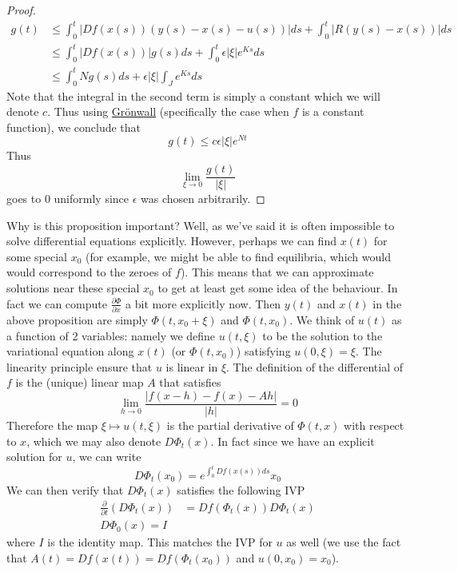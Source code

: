 \begin{proof}
    \begin{align*}
        g(t) &\leq \int_0^t |Df(x(s))(y(s) - x(s) - u(s))| ds + \int_0^t |R(y(s) - x(s))| ds\\
        &\leq \int_0^t |Df(x(s))| g(s) ds + \int_0^t \epsilon |\xi| e^{Ks} ds\\
        &\leq \int_0^t N g(s) ds + \epsilon |\xi| \int_{J} e^{Ks} ds
    \end{align*}
    Note that the integral in the second term is simply a constant which we will denote $c$. Thus using \hyperref[thm:big-gronwall]{Grönwall} (specifically the case when $f$ is a constant function), we conclude that
    $$ g(t) \leq c \epsilon |\xi| e^{Nt} $$
    Thus 
    $$ \lim_{\xi \to 0} \frac{g(t)}{|\xi|} $$
    goes to 0 uniformly since $\epsilon$ was chosen arbitrarily.    
\end{proof}
Why is this proposition important? Well, as we've said it is often impossible to solve differential equations explicitly. However, perhaps we can find $x(t)$ for some special $x_0$ (for example, we might be able to find equilibria, which would would correspond to the zeroes of $f$). This means that we can approximate solutions near these special $x_0$ to get at least get some idea of the behaviour. In fact we can compute $\frac{\partial \Phi}{\partial x}$ a bit more explicitly now. Then $y(t)$ and $x(t)$ in the above proposition are simply $\Phi(t, x_0 + \xi)$ and $\Phi(t, x_0)$. We think of $u(t)$ as a function of 2 variables: namely we define $u(t, \xi)$ to be the solution to the variational equation along $x(t)$ (or $\Phi(t, x_0)$) satisfying $u(0, \xi) = \xi$. The linearity principle ensure that $u$ is linear in $\xi$. The definition of the differential of $f$ is the (unique) linear map $A$ that satisfies 
$$ \lim_{h \to 0} \frac{|f(x - h) - f(x) - Ah|}{|h|} = 0 $$
Therefore the map $\xi \mapsto u(t, \xi)$ is the partial derivative of $\Phi(t, x)$ with respect to $x$, which we may also denote $D\Phi_t(x)$. In fact since we have an explicit solution for $u$, we can write
$$ D \Phi_t(x_0) = e^{\int_0^t Df(x(s)) ds} x_0 $$
We can then verify that $D\Phi_t(x)$ satisfies the following IVP
\begin{align*}
    \frac{\partial}{\partial t} (D \Phi_t (x)) &= Df(\Phi_t(x)) D\Phi_t (x)\\
    D \Phi_0 (x) = I
\end{align*}
where $I$ is the identity map. This matches the IVP for $u$ as well (we use the fact that $A(t) = Df(x(t)) = Df(\Phi_t(x_0))$ and $u(0, x_0) = x_0$).

